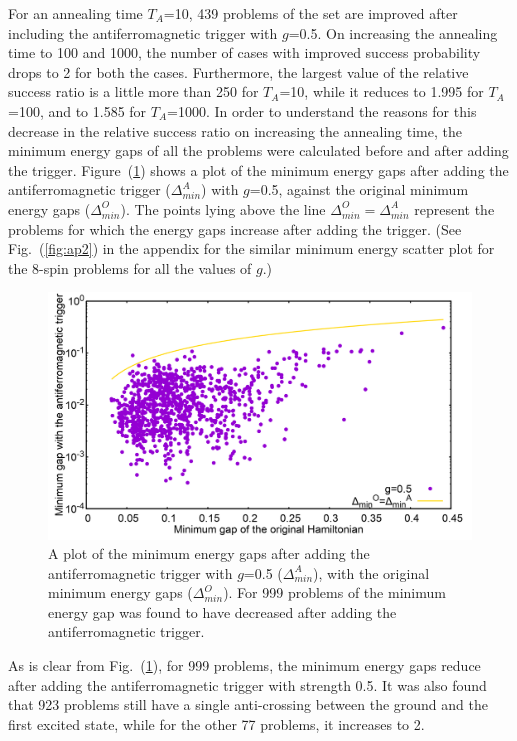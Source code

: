 \documentclass[../main.tex]{subfiles}
\begin{document}
For an annealing time $T_A$=10, 439 problems of the set are improved after including the antiferromagnetic trigger with $g$=0.5. On increasing the annealing time to 100 and 1000, the number of cases with improved success probability drops to 2 for both the cases. Furthermore, the largest value of the relative success ratio is a little more than 250 for $T_A$=10, while it reduces to 1.995 for $T_A$=100, and to 1.585 for $T_A$=1000. In order to understand the reasons for this decrease in the relative success ratio on increasing the annealing time, the minimum energy gaps of all the problems were calculated before and after adding the trigger. Figure~(\ref{fig:a13}) shows a plot of the minimum energy gaps after adding the antiferromagnetic trigger ($\Delta_{min}^A$) with $g$=0.5, against the original minimum energy gaps ($\Delta_{min}^O$). The points lying above the line $\Delta_{min}^O=\Delta_{min}^A$ represent the problems for which the energy gaps increase after adding the trigger. (See Fig.~(\ref{fig:ap2}) in the appendix for the similar minimum energy scatter plot for the 8-spin problems for all the values of $g$.)
\begin{figure}[H]
\centering 
\includegraphics[scale=0.2]{MinGap_A_g0.png}
\caption{A plot of the minimum energy gaps after adding the antiferromagnetic trigger with $g$=0.5 ($\Delta_{min}^A$), with the original minimum energy gaps ($\Delta_{min}^O$). For 999 problems of the minimum energy gap was found to have decreased after adding the antiferromagnetic trigger.}
\label{fig:a13}
\end{figure}
As is clear from Fig.~(\ref{fig:a13}), for 999 problems, the minimum energy gaps reduce after adding the antiferromagnetic trigger with strength 0.5. It was also found that 923 problems still have a single anti-crossing between the ground and the first excited state, while for the other 77 problems, it increases to 2.\\
\end{document}
